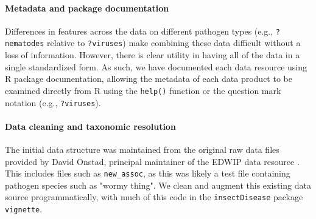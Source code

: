 \documentclass[12pt]{article}
\begin{document}
\paragraph*{Metadata and package documentation}

Differences in features across the data on different pathogen types (e.g., \texttt{?nematodes} relative to \texttt{?viruses}) make combining these data difficult without a loss of information. However, there is clear utility in having all of the data in a single standardized form. As such, we have documented each data resource using R package documentation, allowing the metadata of each data product to be examined directly from R using the \texttt{help()} function or the question mark notation (e.g., \texttt{?viruses}). 














\paragraph*{Data cleaning and taxonomic resolution}

The initial data structure was maintained from the original raw data files provided by David Onstad, principal maintainer of the EDWIP data resource \citep{onstad1997}. This includes files such as \texttt{new\_assoc}, as this was likely a test file containing pathogen species such as "wormy thing". We clean and augment this existing data source programmatically, with much of this code in the \texttt{insectDisease} package \texttt{vignette}. 
\end{document}
